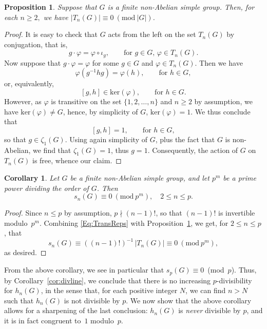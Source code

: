 \documentclass[12pt,reqno]{amsart}
\numberwithin{equation}{section}
\newtheorem{proposition}[theorem]{Proposition}
\newtheorem{corollary}[theorem]{Corollary}
\theoremstyle{remark}
\begin{document}
\begin{proposition}
\label{Prop:FiniteSimpleT}
Suppose that $G$ is a finite non-Abelian simple group. Then, for each
$n\geq2,$ we have $\vert T_n(G)\vert \equiv 0
~(\mathrm{mod}~\vert G\vert)$. 
\end{proposition}

\begin{proof}
It is easy to check that $G$ acts from the left on the set $T_n(G)$ by
conjugation, that is, 
\[
g\cdot \varphi = \varphi \circ \iota_g,\quad \quad 
\text{for }g\in G, \,\varphi\in T_n(G). 
\]
Now suppose that $g\cdot \varphi = \varphi$ for some $g\in G$ and
$\varphi\in T_n(G)$. Then we have  
\[
\varphi(g^{-1}hg) = \varphi(h),\quad\quad 
\text{for } h\in G,
\] 
or, equivalently,
\[
[g, h]\in \mathrm{ker}(\varphi),\quad\quad 
\text{for } h\in G.
\]
However, as $\varphi$ is transitive on the set $\{1, 2, \ldots, n\}$
and $n\geq2$ by assumption, we have $\mathrm{ker}(\varphi) \neq G$,
hence, by simplicity of $G$, $\mathrm{ker}(\varphi) = 1$. We thus
conclude that  
\[
[g, h] = 1,\quad\quad 
\text{for } h\in G,
\] 
so that $g\in \zeta_1(G)$. Using again simplicity of $G$, plus the
fact that $G$ is non-Abelian, we find that $\zeta_1(G)=1$, thus
$g=1$. Consequently, the action of $G$ on $T_n(G)$ is free, whence our
claim. 
\end{proof}

\begin{corollary}
\label{Cor:FiniteSimplep}
Let\/ $G$ be a finite non-Abelian simple group, and let $p^m$ be a prime power
dividing  the order of $G$. Then 
\begin{equation}
\label{Eq:FiniteSimplep}
s_n(G) \equiv 0~(\mathrm{mod}~p^m),\quad 2\leq n\leq p.
\end{equation}
\end{corollary}

\begin{proof}
Since $n\leq p$ by assumption, $p \nmid (n-1)!$, so that $(n-1)!$ is
invertible modulo~$p^m$. Combining \eqref{Eq:TransReps} with
Proposition~\ref{Prop:FiniteSimpleT}, we get, for $2\leq n\leq p$,
that 
\[
s_n(G) \equiv ((n-1)!)^{-1}\, \vert T_n(G)\vert \equiv
0~(\mathrm{mod}~p^m), 
\]
as desired.
\end{proof}

From the above corollary, we see in particular that 
$s_p(G)\equiv 0$~(mod~$p$). Thus,
by Corollary~\ref{cor:divline}, we conclude that there is no increasing
$p$-divisibility for $h_n(G)$, in the sense that, for each positive
integer $N$, we can find $n>N$ such that $h_n(G)$ is not divisible by $p$.
We now show that the above corollary allows for a sharpening of the last
conclusion: $h_n(G)$ is {\it never} divisible by $p$, and it is in
fact congruent to~$1$ modulo~$p$.
\end{document}
